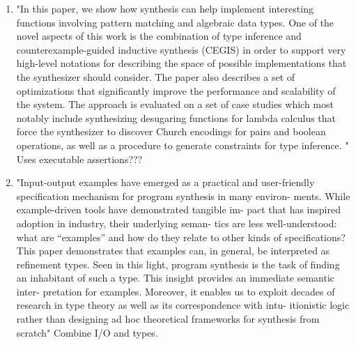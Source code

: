 \begin{enumerate}
\item \cite{DBLP:journals/corr/InalaQLS15} "In this paper, we show how synthesis can help implement interesting functions involving pattern matching and algebraic data types. One of the novel aspects of this work is the combination of type inference and counterexample-guided inductive synthesis (CEGIS) in order to support very high-level notations for describing the space of possible implementations that the synthesizer should consider. The paper also describes a set of optimizations that significantly improve the performance and scalability of the system.
The approach is evaluated on a set of case studies which most notably include synthesizing desugaring functions for lambda calculus that force the synthesizer to discover Church encodings for pairs and boolean operations, as well as a procedure to generate constraints for type inference. " Uses executable assertions???
\item \cite{Frankle:2016:EST:2837614.2837629} "Input-output examples have emerged as a practical and user-friendly
specification mechanism for program synthesis in many environ-
ments. While example-driven tools have demonstrated tangible im-
pact that has inspired adoption in industry, their underlying seman-
tics are less well-understood: what are “examples” and how do they
relate to other kinds of specifications? This paper demonstrates that
examples can, in general, be interpreted as refinement types. Seen
in this light, program synthesis is the task of finding an inhabitant
of such a type. This insight provides an immediate semantic inter-
pretation for examples. Moreover, it enables us to exploit decades
of research in type theory as well as its correspondence with intu-
itionistic logic rather than designing ad hoc theoretical frameworks
for synthesis from scratch" Combine I/O and types.
\end{enumerate}

